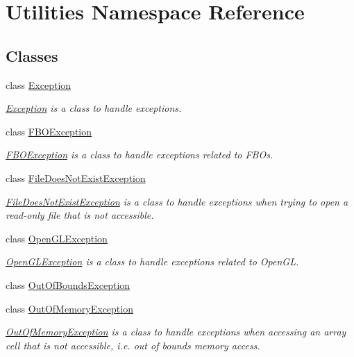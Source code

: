 \hypertarget{namespace_utilities}{
\section{Utilities Namespace Reference}
\label{namespace_utilities}
}
\subsection*{Classes}
\begin{DoxyCompactItemize}
\item 
class \hyperlink{class_utilities_1_1_exception}{Exception}
\begin{DoxyCompactList}\small\item\em \hyperlink{class_utilities_1_1_exception}{Exception} is a class to handle exceptions. \end{DoxyCompactList}\item 
class \hyperlink{class_utilities_1_1_f_b_o_exception}{FBOException}
\begin{DoxyCompactList}\small\item\em \hyperlink{class_utilities_1_1_f_b_o_exception}{FBOException} is a class to handle exceptions related to FBOs. \end{DoxyCompactList}\item 
class \hyperlink{class_utilities_1_1_file_does_not_exist_exception}{FileDoesNotExistException}
\begin{DoxyCompactList}\small\item\em \hyperlink{class_utilities_1_1_file_does_not_exist_exception}{FileDoesNotExistException} is a class to handle exceptions when trying to open a read-\/only file that is not accessible. \end{DoxyCompactList}\item 
class \hyperlink{class_utilities_1_1_open_g_l_exception}{OpenGLException}
\begin{DoxyCompactList}\small\item\em \hyperlink{class_utilities_1_1_open_g_l_exception}{OpenGLException} is a class to handle exceptions related to OpenGL. \end{DoxyCompactList}\item 
class \hyperlink{class_utilities_1_1_out_of_bounds_exception}{OutOfBoundsException}
\item 
class \hyperlink{class_utilities_1_1_out_of_memory_exception}{OutOfMemoryException}
\begin{DoxyCompactList}\small\item\em \hyperlink{class_utilities_1_1_out_of_memory_exception}{OutOfMemoryException} is a class to handle exceptions when accessing an array cell that is not accessible, i.e. out of bounds memory access. \end{DoxyCompactList}\end{DoxyCompactItemize}
